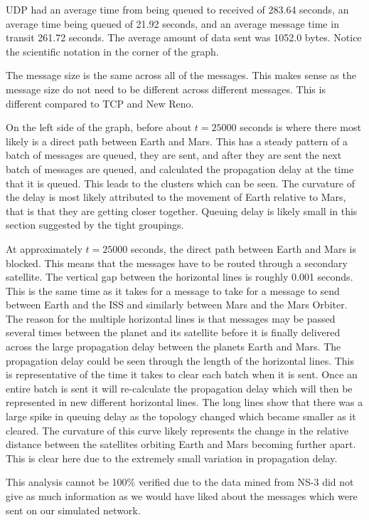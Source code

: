 \documentclass[a4paper,12pt]{article}
\begin{document}
UDP had an average time from being queued to received of 283.64 seconds, an
average time being queued of 21.92 seconds, and an average message time in
transit 261.72 seconds. The average amount of data sent was 1052.0 bytes. Notice
the scientific notation in the corner of the graph.

The message size is the same across all of the messages. This makes sense as the
message size do not need to be different across different messages. This is
different compared to TCP and New Reno.

On the left side of the graph, before about $t = 25000$ seconds is where there
most likely is a direct path between Earth and Mars. This has a steady pattern
of a batch of messages are queued, they are sent, and after they are sent the
next batch of messages are queued, and calculated the propagation delay at the
time that it is queued. This leads to the clusters which can be seen. The
curvature of the delay is most likely attributed to the movement of Earth
relative to Mars, that is that they are getting closer together. Queuing delay
is likely small in this section suggested by the tight groupings.

At approximately $t = 25000$ seconds, the direct path between Earth and Mars is
blocked. This means that the messages have to be routed through a secondary
satellite. The vertical gap between the horizontal lines is roughly 0.001
seconds. This is the same time as it takes for a message to take for a message
to send between Earth and the ISS and similarly between Mars and the Mars
Orbiter. The reason for the multiple horizontal lines is that messages may be
passed several times between the planet and its satellite before it is finally
delivered across the large propagation delay between the planets Earth and Mars.
The propagation delay could be seen through the length of the horizontal lines.
This is representative of the time it takes to clear each batch when it is sent.
Once an entire batch is sent it will re-calculate the propagation delay which
will then be represented in new different horizontal lines. The long lines show
that there was a large spike in queuing delay as the topology changed which
became smaller as it cleared. The curvature of this curve likely represents the
change in the relative distance between the satellites orbiting Earth and Mars
becoming further apart. This is clear here due to the extremely small variation
in propagation delay.

This analysis cannot be 100\% verified due to the data mined from NS-3 did not
give as much information as we would have liked about the messages which were
sent on our simulated network.
\end{document}
